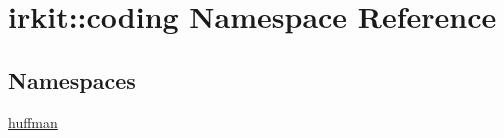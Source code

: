 \hypertarget{namespaceirkit_1_1coding}{}\section{irkit\+:\+:coding Namespace Reference}
\label{namespaceirkit_1_1coding}
\subsection*{Namespaces}
\begin{DoxyCompactItemize}
\item 
 \mbox{\hyperlink{namespaceirkit_1_1coding_1_1huffman}{huffman}}
\end{DoxyCompactItemize}
